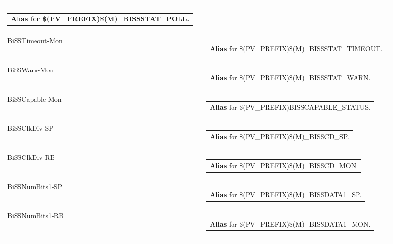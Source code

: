 \documentclass[openany]{article}
\begin{document}
\begin{longtable}{| m{4.5cm} m{2.5cm}  m{8.5cm} |}
\begin{tabular}{@{}m{6cm}@{}}
                \textbf{\color{blue} Alias} for \$(PV\_PREFIX)\$(M)\_BISSSTAT\_POLL.
            \end{tabular} \hypertarget{pv:biss-timeout-mon}{}\\ \hline
        BiSSTimeout-Mon &  & \begin{tabular}{@{}m{6cm}@{}}
                \textbf{\color{blue} Alias} for \$(PV\_PREFIX)\$(M)\_BISSSTAT\_TIMEOUT.
            \end{tabular} \hypertarget{pv:biss-warn-mon}{}\\ \hline
        BiSSWarn-Mon &  & \begin{tabular}{@{}m{6cm}@{}}
                \textbf{\color{blue} Alias} for \$(PV\_PREFIX)\$(M)\_BISSSTAT\_WARN.
            \end{tabular} \hypertarget{pv:biss-capable-mon}{}\\ \hline
        BiSSCapable-Mon &  & \begin{tabular}{@{}m{6cm}@{}}
                \textbf{\color{blue} Alias} for \$(PV\_PREFIX)BISSCAPABLE\_STATUS.
            \end{tabular} \hypertarget{pv:biss-clk-div}{}\\ \hline
        BiSSClkDiv-SP &  & \begin{tabular}{@{}m{6cm}@{}}
                \textbf{\color{blue} Alias} for \$(PV\_PREFIX)\$(M)\_BISSCD\_SP.
            \end{tabular} \hypertarget{}{}\\ \hline
        BiSSClkDiv-RB &  & \begin{tabular}{@{}m{6cm}@{}}
                \textbf{\color{blue} Alias} for \$(PV\_PREFIX)\$(M)\_BISSCD\_MON.
            \end{tabular} \hypertarget{pv:biss-num-bits-1}{}\\ \hline
        BiSSNumBits1-SP &  & \begin{tabular}{@{}m{6cm}@{}}
                \textbf{\color{blue} Alias} for \$(PV\_PREFIX)\$(M)\_BISSDATA1\_SP.
            \end{tabular} \hypertarget{}{}\\ \hline
        BiSSNumBits1-RB &  & \begin{tabular}{@{}m{6cm}@{}}
                \textbf{\color{blue} Alias} for \$(PV\_PREFIX)\$(M)\_BISSDATA1\_MON.
            \end{tabular} \hypertarget{pv:biss-num-bits-2}{}\\ \hline

\end{longtable}
\end{document}
